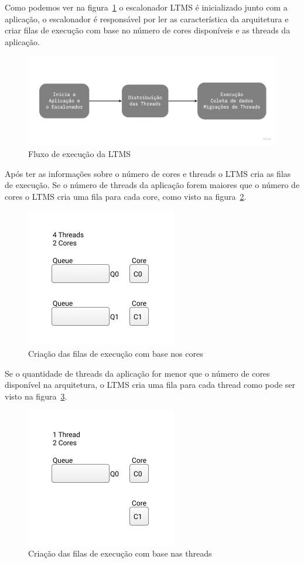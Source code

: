 \documentclass[diss,capa]{texufpel}
\begin{document}
Como podemos ver na figura~\ref{ltms_generic} o escalonador LTMS é inicializado junto com a aplicação, o escalonador é responsável por ler as característica da arquitetura e criar filas de execução com base no número de cores disponíveis e as threads da aplicação.

\begin{figure}[htbp]
  \centering \includegraphics[scale=.25]{images/ltms_generic}
\caption{Fluxo de execução da LTMS} 
\label{ltms_generic}
\end{figure}

Após ter as informações sobre o número de cores e threads o LTMS cria as filas de execução. Se o número de threads da aplicação forem maiores que o número de cores o LTMS cria uma fila para cada core, como visto na figura~\ref{queue_core}.

\begin{figure}[htbp]
  \centering
  \includegraphics[scale=.8]{images/Queue_core.png}
  \caption{Criação das filas de execução com base nos cores}
\label{queue_core}
\end{figure}

Se o quantidade de threads da aplicação for menor que o número de cores disponível na arquitetura, o LTMS cria uma fila para cada thread como pode ser visto na figura~\ref{queue_thread}.

\begin{figure}[htbp]
  \centering
  \includegraphics[scale=.8]{images/Queues_thread.png}
\caption{Criação das filas de execução com base nas threads} 
\label{queue_thread}
\end{figure}
\end{document}
